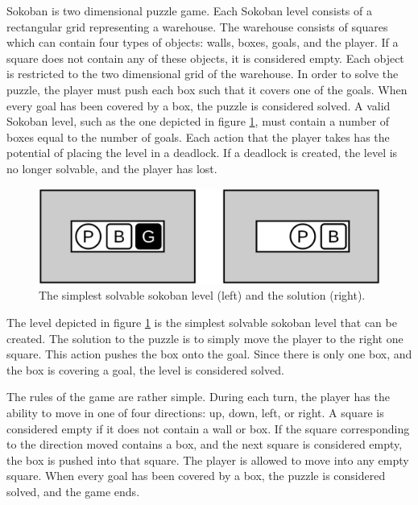\documentclass[times, 10pt,twocolumn]{article}
\begin{document}

Sokoban is two dimensional puzzle game. Each Sokoban level consists of a rectangular grid representing a warehouse. The warehouse consists of squares which can contain four types of objects: walls, boxes, goals, and the player. If a square does not contain any of these objects, it is considered empty. Each object is restricted to the two dimensional grid of the warehouse. In order to solve the puzzle, the player must push each box such that it covers one of the goals. When every goal has been covered by a box, the puzzle is considered solved. A valid Sokoban level, such as the one depicted in figure \ref{fig:b}, must contain a number of boxes equal to the number of goals. Each action that the player takes has the potential of placing the level in a deadlock. If a deadlock is created, the level is no longer solvable, and the player has lost.

\begin{figure}[h] 
  \centering
     \includegraphics[width=0.7\linewidth]{images/basic_unsolved_solved.png}
  \caption{The simplest solvable sokoban level (left) and the solution (right).}
  \label{fig:b}
\end{figure}

The level depicted in figure \ref{fig:b} is the simplest solvable sokoban level that can be created. The solution to the puzzle is to simply move the player to the right one square. This action pushes the box onto the goal. Since there is only one box, and the box is covering a goal, the level is considered solved.


The rules of the game are rather simple. During each turn, the player has the ability to move in one of four directions: up, down, left, or right. A square is considered empty if it does not contain a wall or box. If the square corresponding to the direction moved contains a box, and the next square is considered empty, the box is pushed into that square. The player is allowed to move into any empty square. When every goal has been covered by a box, the puzzle is considered solved, and the game ends.
\end{document}
